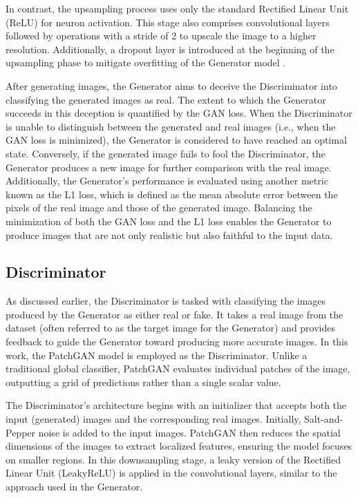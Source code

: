 In contrast, the upsampling process uses only the standard Rectified Linear Unit (ReLU) for neuron activation. This stage also comprises convolutional layers followed by operations with a stride of 2 to upscale the image to a higher resolution. Additionally, a dropout layer is introduced at the beginning of the upsampling phase to mitigate overfitting of the Generator model \cite{isola2017image}.

After generating images, the Generator aims to deceive the Discriminator into classifying the generated images as real. The extent to which the Generator succeeds in this deception is quantified by the GAN loss. When the Discriminator is unable to distinguish between the generated and real images (i.e., when the GAN loss is minimized), the Generator is considered to have reached an optimal state. Conversely, if the generated image fails to fool the Discriminator, the Generator produces a new image for further comparison with the real image. Additionally, the Generator's performance is evaluated using another metric known as the L1 loss, which is defined as the mean absolute error between the pixels of the real image and those of the generated image. Balancing the minimization of both the GAN loss and the L1 loss enables the Generator to produce images that are not only realistic but also faithful to the input data. 

\subsection{Discriminator}
As discussed earlier, the Discriminator is tasked with classifying the images produced by the Generator as either real or fake. It takes a real image from the dataset (often referred to as the target image for the Generator) and provides feedback to guide the Generator toward producing more accurate images. In this work, the PatchGAN model \cite{isola2017image} is employed as the Discriminator. Unlike a traditional global classifier, PatchGAN evaluates individual patches of the image, outputting a grid of predictions rather than a single scalar value.

The Discriminator’s architecture begins with an initializer that accepts both the input (generated) images and the corresponding real images. Initially, Salt-and-Pepper noise is added to the input images. PatchGAN then reduces the spatial dimensions of the images to extract localized features, ensuring the model focuses on smaller regions. In this downsampling stage, a leaky version of the Rectified Linear Unit (LeakyReLU) is applied in the convolutional layers, similar to the approach used in the Generator.


